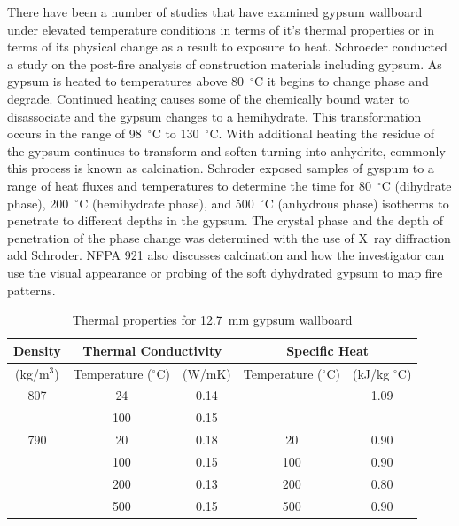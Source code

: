 \documentclass[twoside]{uocthesis}
\begin{document}
There have been a number of studies that have examined gypsum wallboard under elevated temperature conditions in terms of it's thermal properties or in terms of its physical change as a result to exposure to heat.  Schroeder conducted a study on the post-fire analysis of construction materials including gypsum.  As gypsum is heated to temperatures above 80~$^\circ$C it begins to change phase and degrade.  Continued heating causes some of the chemically bound water to disassociate and the gypsum changes to a hemihydrate.  This transformation occurs in the range of 98~$^\circ$C to 130~$^\circ$C. With additional heating the residue of the gypsum continues to transform and soften turning into anhydrite, commonly this process is known as calcination.  Schroder exposed samples of gyspum to a range of heat fluxes and temperatures to determine the time for 80~$^\circ$C (dihydrate phase), 200~$^\circ$C (hemihydrate phase), and 500~$^\circ$C (anhydrous phase) isotherms to penetrate to different depths in the gypsum.  The crystal phase and the depth of penetration of the phase change was determined with the use of X~\-ray diffraction  add Schroder.  NFPA 921 also discusses calcination and how the investigator can use the visual appearance or probing of the soft dyhydrated gypsum to map fire patterns.

\begin{table}
	\centering
	\begin{tabular}{|c|c|c|c|c|}
		\hline Density & \multicolumn{2}{c|}{Thermal Conductivity}   & \multicolumn{2}{c|}{Specific Heat}  \\
		\hline (kg/m$^3$) & Temperature ($^{\circ}$C) & (W/mK)  & Temperature ($^{\circ}$C)  & (kJ/kg $^{\circ}$C) \\
		\hline 807  & 24 	& 0.14 	&  		& 1.09 \\
		\hline  	& 100 	& 0.15  &  		&  \\
		\hline 790 	& 20 	& 0.18	& 20 	& 0.90 \\
		\hline  	& 100 	& 0.15 	& 100 	& 0.90 \\
		\hline  	& 200 	& 0.13 	& 200 	& 0.80 \\
		\hline  	& 500 	& 0.15 	& 500	& 0.90 \\
		\hline
		\end{tabular}
		\caption[Thermal properties for 12.7~mm gypsum wallboard]{Thermal properties for 12.7~mm gypsum wallboard}
		\label{tab:Gypsum wallboard_Thermal_Properties}
		\end{table}
\end{document}
